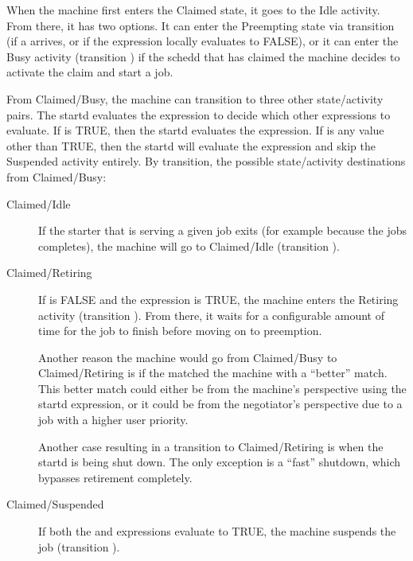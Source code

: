 When the machine first enters the Claimed state, it goes to the Idle
activity.  From there, it has two options.  
It can enter the Preempting state via transition  (if a 
 arrives, or if the  expression locally
evaluates to FALSE),  
or it can enter the Busy activity (transition ) if the
schedd that has claimed the machine decides to activate the claim and
start a job.

From Claimed/Busy, the machine can transition to three other state/activity
pairs.
The startd evaluates the  expression to decide
which other expressions to evaluate.  
If  is TRUE, then the startd evaluates the
 expression.
If  is any value other than TRUE, then the startd will
evaluate the  expression and skip the Suspended activity
entirely.
By transition, the possible state/activity destinations from Claimed/Busy:

\begin{description}
  
\item[Claimed/Idle] If the starter that is serving a given job exits
  (for example because the jobs completes), the machine will go
  to Claimed/Idle (transition ).
  
\item[Claimed/Retiring] If  is FALSE and the
   expression is TRUE, the machine enters the
  Retiring activity (transition ).  From there, it
  waits for a configurable amount of time for the job to finish
  before moving on to preemption.

  Another reason the machine would go from Claimed/Busy to
  Claimed/Retiring is if the  matched the machine
  with a ``better'' match.  This better match could either be from the
  machine's perspective using the startd  expression,
  or it could be from the negotiator's perspective due to
  a job with a higher user priority.

  Another case resulting in a transition to Claimed/Retiring is when
  the startd is being shut down.  The only exception is a ``fast''
  shutdown, which bypasses retirement completely.
  
\item[Claimed/Suspended] If both the  and
   expressions evaluate to TRUE, the machine
  suspends the job (transition ).
  
\end{description}
  
